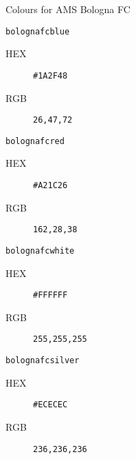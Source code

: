 \documentclass[presentation]{beamer}\mode<presentation>{\usetheme{AMSBolognaFC}}
\begin{document}
	\begin{frame}[c,allowframebreaks]{Colours for AMS Bologna FC}
		\begin{exampleblock}{\texttt{\textcolor{bolognafcblue}{bolognafcblue}}}
			\begin{description}
				\item[HEX] \texttt{\#1A2F48}
				\item[RGB] \texttt{26,47,72}
			\end{description}
		\end{exampleblock}
		\begin{exampleblock}{\texttt{\textcolor{bolognafcred}{bolognafcred}}}
			\begin{description}
				\item[HEX] \texttt{\#A21C26}
				\item[RGB] \texttt{162,28,38}
			\end{description}
		\end{exampleblock}
		\framebreak
		\begin{block}{\texttt{\textcolor{bolognafcwhite}{bolognafcwhite}}}
			\begin{description}
				\item[HEX] \texttt{\#FFFFFF}
				\item[RGB] \texttt{255,255,255}
			\end{description}
		\end{block}
		\begin{alertblock}{\texttt{\textcolor{bolognafcsilver}{bolognafcsilver}}}
			\begin{description}
				\item[HEX] \texttt{\#ECECEC}
				\item[RGB] \texttt{236,236,236}
			\end{description}
		\end{alertblock}
	\end{frame}
	
\end{document}
